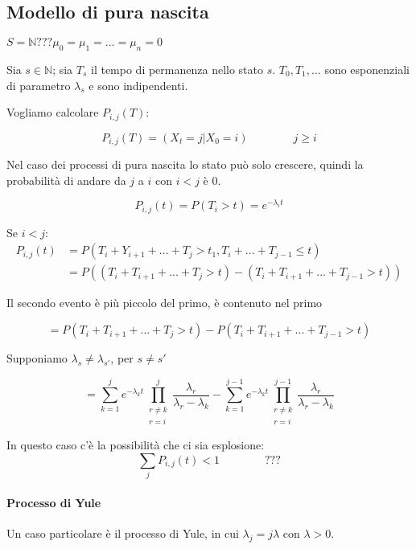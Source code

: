 \documentclass[a4paper,12pt]{book}
\begin{document}
\subsection{Modello di pura nascita}
$ S = \mathbb{N} ??? \mu_0 = \mu_1 = ... = \mu_n = 0 $ %

Sia $ s \in \mathbb{N} $; sia $ T_s $ il tempo di permanenza nello stato $ s $. $ T_0, T_1, ... $ sono esponenziali di parametro $\lambda_s$ e sono indipendenti. 

Vogliamo calcolare $ P_{i,j}(T): $

$$ P_{i,j}(T) = (X_t = j | X_0 = i) \qquad \qquad j \ge i $$

Nel caso dei processi di pura nascita lo stato può solo crescere, quindi la probabilità di andare da $ j $ a $ i $ con $ i < j $ è 0. 

$$ P_{i,j}(t) = P(T_i > t) = e^{-\lambda_i t} $$

Se $ i < j $: 
\begin{align*}
	P_{i,j}(t) & = P(T_i + Y_{i+1} + ... + T_j > t_1, T_i + ... + T_{j-1} \le t) \\
	& = P((T_i + T_{i+1} + ... + T_j > t) - (T_i + T_{i+1} + ... + T_{j-1} > t))
\end{align*}

Il secondo evento è più piccolo del primo, è contenuto nel primo

$$ = P(T_i + T_{i+1} + ... + T_j > t) - P(T_i + T_{i+1} + ... + T_{j-1} > t) $$

Supponiamo $\lambda_s \ne \lambda_{s'}$, per $ s \ne s' $

$$ = \sum_{k=1}^{j} e^{-\lambda_k t} \prod_{\begin{array}{c}
	r \ne k \\ %
	r = i
	\end{array}}^{j} \frac{\lambda_r}{\lambda_r - \lambda_k} - \sum_{k=1}^{j-1} e^{-\lambda_k t} \prod_{\begin{array}{c}
	r \ne k \\ %
	r = i
	\end{array}}^{j-1} \frac{\lambda_r}{\lambda_r - \lambda_k}$$

In questo caso c'è la possibilità che ci sia esplosione:
$$ \sum_j P_{i,j}(t) < 1 \qquad \qquad ???$$ %

\paragraph{Processo di Yule} Un caso particolare è il processo di Yule, in cui $\lambda_j = j\lambda$ con $\lambda > 0$.
\end{document}
